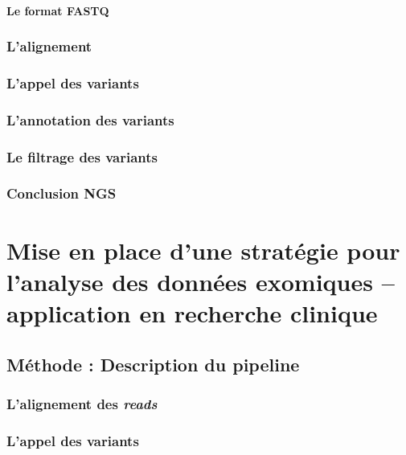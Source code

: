 \documentclass[12pt,a4paper,twoside]{ugathesis}
\begin{document}
\subsubsection{Le format FASTQ}\label{fastq}

\subsection{L'alignement}\label{lalignement}

\subsection{L'appel des variants}\label{varcall}

\subsection{L'annotation des variants}\label{lannotation-des-variants}

\subsection{Le filtrage des variants}\label{le-filtrage-des-variants}

\subsection{Conclusion NGS}\label{conclusion-ngs}

\chapter{Mise en place d'une stratégie pour l'analyse des données
exomiques -- application en recherche
clinique}\label{mise-en-place-dune-strategie-pour-lanalyse-des-donnees-exomiques-application-en-recherche-clinique}

\section{Méthode : Description du
pipeline}\label{methode-description-du-pipeline}

\subsection{\texorpdfstring{L'alignement des
\emph{reads}}{L'alignement des reads}}\label{lalignement-des-reads}

\subsection{L'appel des variants}\label{lappel-des-variants}
\end{document}
